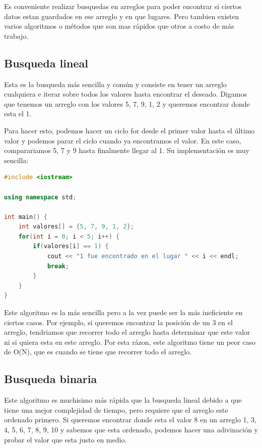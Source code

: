 \documentclass{article}
\begin{document}
Es conveniente realizar busquedas en arreglos para poder encontrar si ciertos datos estan guardados en ese arreglo y en que lugares. Pero tambien existen varios algoritmos o métodos que son mas rápidos que otros a costo de más trabajo.

\subsection{Busqueda lineal}

Esta es la busqueda más sencilla y común y consiste en tener un arreglo cualquiera e iterar sobre todos los valores hasta encontrar el deseado. Digamos que tenemos un arreglo con los valores 5, 7, 9, 1, 2 y queremos encontrar donde esta el 1.

Para hacer esto, podemos hacer un ciclo for desde el primer valor hasta el último valor y podemos parar el ciclo cuando ya encontramos el valor. En este caso, comparariamos 5, 7 y 9 hasta finalmente llegar al 1. Su implementación es muy sencilla:

\begin{lstlisting}[language=C++, caption=¿Optimizando?]
#include <iostream>

using namespace std;

int main() {
    int valores[] = {5, 7, 9, 1, 2};
    for(int i = 0; i < 5; i++) {
        if(valores[i] == 1) {
            cout << "1 fue encontrado en el lugar " << i << endl;
            break;
        }
    }
}
\end{lstlisting}

Este algoritmo es la más sencilla pero a la vez puede ser la más ineficiente en ciertos casos. Por ejemplo, si queremos encontrar la posición de un 3 en el arreglo, tendriamos que recorrer todo el arreglo hasta determinar que este valor ni si quiera esta en este arreglo. Por esta rázon, este algoritmo tiene un peor caso de O(N), que es cuando se tiene que recorrer todo el arreglo.

\subsection{Busqueda binaria}

Este algoritmo es muchisimo más rápida que la busqueda lineal debido a que tiene una mejor complejidad de tiempo, pero requiere que el arreglo este ordenado primero. Si queremos encontrar donde esta el valor 8 en un arreglo {1, 3, 4, 5, 6, 7, 8, 9, 10} y sabemos que esta ordenado, podemos hacer una adivinación y probar el valor que esta justo en medio.
\end{document}
